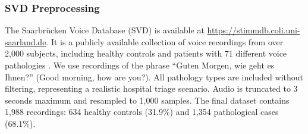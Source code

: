 \documentclass[times, review, 10pt]{elsarticle}
\begin{document}
\subsubsection{SVD Preprocessing}

The Saarbr\"ucken Voice Database (SVD) \cite{svd_database} is available at \url{https://stimmdb.coli.uni-saarland.de}.
It is a publicly available collection of voice recordings from over 2{,}000
subjects, including healthy controls and patients with 71 different voice pathologies \cite{martinez2012voice}.
We use recordings of the phrase ``Guten Morgen, wie geht es Ihnen?'' (Good morning, how are you?).
All pathology types are included without filtering, representing a realistic hospital triage scenario.
Audio is truncated to 3 seconds maximum and resampled to 1{,}000 samples.
The final dataset contains 1{,}988 recordings: 634 healthy controls (31.9\%) and 1{,}354 pathological cases (68.1\%).
\end{document}
